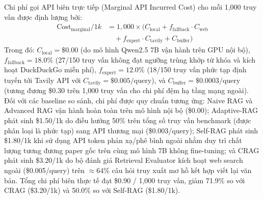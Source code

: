 \documentclass[conference]{IEEEtran}
\begin{document}
Chi phí gọi API biên trực tiếp (Marginal API Incurred Cost) cho mỗi 1,000 truy vấn được định lượng bởi:
\begin{equation}
\begin{aligned}
\text{Cost}_{\text{marginal}}/1k
&= 1{,}000 \times \big(
C_{\text{local}}
+ f_{\text{fallback}} \cdot C_{\text{web}} \\
&\quad + f_{\text{expert}} \cdot C_{\text{tavily}}
+ C_{\text{buffer}} \big)
\end{aligned}
\end{equation}
Trong đó: $C_{\text{local}} = \$0.00$ (do mô hình Qwen2.5 7B vận hành trên GPU nội bộ), $f_{\text{fallback}} = 18.0\%$ (27/150 truy vấn không đạt ngưỡng trùng khớp từ khóa và kích hoạt DuckDuckGo miễn phí), $f_{\text{expert}} = 12.0\%$ (18/150 truy vấn phức tạp định tuyến tới Tavily API với $C_{\text{tavily}} = \$0.005/\text{query}$), và $C_{\text{buffer}} = \$0.0003/\text{query}$ (tương đương \$0.30 trên 1,000 truy vấn cho chi phí đệm hạ tầng mạng ngoài). Đối với các baseline so sánh, chi phí được quy chuẩn tương ứng: Naive RAG và Advanced RAG vận hành hoàn toàn trên mô hình nội bộ (\$0.00); Adaptive-RAG phát sinh \$1.50/1k do điều hướng 50\% trên tổng số truy vấn benchmark (được phân loại là phức tạp) sang API thương mại (\$0.003/query); Self-RAG phát sinh \$1.80/1k khi sử dụng API token phản xạ/phê bình ngoài nhằm duy trì chất lượng tương đương paper gốc trên cùng mô hình 7B không fine-tuning; và CRAG phát sinh \$3.20/1k do bộ đánh giá Retrieval Evaluator kích hoạt web search ngoài (\$0.005/query) trên $\approx 64\%$ câu hỏi truy xuất mơ hồ kết hợp viết lại văn bản. Tổng chi phí biên thực tế đạt \$0.90 / 1,000 truy vấn, giảm 71.9\% so với CRAG (\$3.20/1k) và 50.0\% so với Self-RAG (\$1.80/1k).
\end{document}
